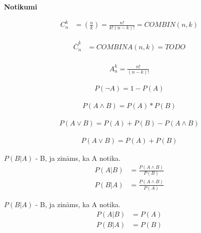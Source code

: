 \linebreak
\textbf{Notikumi}

{\begin{align*}
    C_n^k &= (\frac{n}{k}) = \frac{n!}{k!(n-k)!} = COMBIN(n, k)
\end{align*}}

{\begin{align*}
    \overline{C}_n^k &= COMBINA(n, k) = TODO \\
\end{align*}}

{\begin{align*}
    A_n^k = \frac{n!}{(n-k)!}
\end{align*}}

{\begin{align*}
    P(\lnot A ) = 1 - P (A)
\end{align*}}

{\begin{align*}
    P(A \land B) = P(A) * P(B)
\end{align*}}

{\begin{align*}
    P(A \lor B) = P(A) + P(B) - P(A \land B)
\end{align*}}

{\begin{align*}
    P(A \lor B) = P(A) + P(B)
\end{align*}}


{

    $P(B|A)$ - B, ja zināms, ka A notika.
    \begin{align*}
        P(A|B) &= \displaystyle\frac{P(A \land B)}{P(B)} \\
        P(B|A) &= \displaystyle\frac{P(A \land B)}{P(A)}
    \end{align*}
}



{

    $P(B|A)$ - B, ja zināms, ka A notika.
    \begin{align*}
        P(A|B) &= P(A) \\ 
        P(B|A) &= P(B) 
    \end{align*}
}


